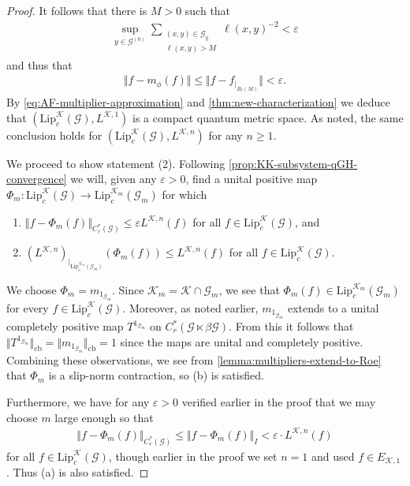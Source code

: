 \documentclass[11pt,a4paper,oneside,final,reqno]{amsart}
\theoremstyle{definition}
\newcommand{\G}{\mathcal{G}}
\newcommand{\Go}{\mathcal{G}^{(0)}}
\newcommand{\cK}{\mathcal{K}}
\newcommand{\Lip}{\mathrm{Lip}}
\newcommand{\Cred}{C_{r}^{*}}
\numberwithin{equation}{section}
\begin{document}
\begin{proof}
		It follows that there is $M>0$ such that 
		\begin{align*}
			\sup_{y \in \Go} \sum_{\substack{(x,y)\in \G_y \\ \ell(x,y) > M}} \ell(x,y)^{-2} < \varepsilon
		\end{align*}
		and thus that 
		\begin{align*}
			\Vert f - m_{\phi}(f) \Vert \leq \Vert f - f_{\vert_{B_\ell(M)}} \Vert < \varepsilon.
		\end{align*}
		By \eqref{eq:AF-multiplier-approximation} and \cref{thm:new-characterization} we deduce that 
		$(\Lip_c^{\cK}(\G), L^{\cK, 1})$ 
		is a compact quantum metric space. As noted, the same conclusion holds for 
		$(\Lip_c^{\cK}(\G), L^{\cK, n})$ 
		for any $n \geq 1$. 
		
		We proceed to show statement (2). Following \cref{prop:KK-subsystem-qGH-convergence} we will, given any $\varepsilon > 0$, find a unital positive map 
		$\Phi_m \colon  \Lip_c^{\cK}(\G) \to \Lip_c^{\cK_m} (\G_m)$
		for which
		\begin{enumerate}
			\item[(a)] $\Vert f - \Phi_m (f) \Vert_{\Cred(\G)} \leq \varepsilon L^{\cK, n}(f)$ for all 
			$f \in \Lip_c^{\cK}(\G)$, 
			and
			\item[(b)] 
			$(L^{\cK, n})_{\vert_{\Lip_c^{\cK_m}(\G_m)}}(\Phi_m (f)) \leq L^{\cK, n}(f)$ 
			for all 
			$f \in \Lip_c^{\cK}(\G)$.
		\end{enumerate} 
		We choose $\Phi_m = m_{1_{\G_{m}}}$. Since $\cK_m = \cK \cap \G_m$, we see that $\Phi_m(f) \in \Lip_c^{\cK_m}(\G_m)$ for every $f\in \Lip_c^{\cK}(\G)$.  
			Moreover, as noted earlier, 
		$m_{1_{\G_{m}}}$ extends to a unital completely positive map $T^{1_{\G_{m}}}$ on $\Cred(\G \ltimes \beta\G  )$. From this it follows that $\Vert T^{1_{\G_{m}}} \Vert_{\mathrm{cb}} = \Vert m_{1_{\G_{m}}}\Vert_{\mathrm{cb}} = 1$ since the maps are unital and completely positive. Combining these observations, we see from \cref{lemma:multipliers-extend-to-Roe} that $\Phi_m$ is a slip-norm contraction, so (b) is satisfied.
		
		Furthermore, we have for any $\varepsilon > 0$ verified earlier in the proof that we may choose $m$ large enough so that
		\begin{align*}
			\Vert f - \Phi_m (f) \Vert_{\Cred(\G)} \leq \Vert f - \Phi_m (f) \Vert_I < \varepsilon \cdot L^{\cK, n}(f)
		\end{align*}
		for all 
		$f \in  \Lip_c^{\cK}(\G)$, 
		though earlier in the proof we set $n=1$ and used $f \in E_{\cK,1}$. Thus (a) is also satisfied. 
		

\end{proof}
\end{document}
